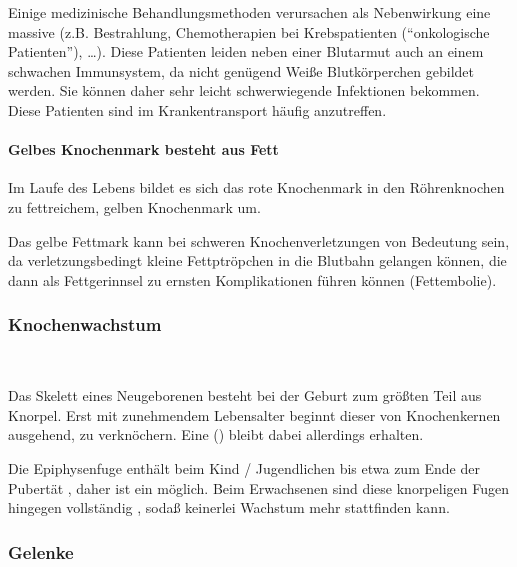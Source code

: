 
Einige medizinische Behandlungsmethoden
verursachen als Nebenwirkung eine massive  (z.B. Bestrahlung, Chemotherapien bei
Krebspatienten ("`onkologische
Patienten"'), \ldots). Diese Patienten leiden neben einer
Blutarmut auch an einem schwachen Immunsystem, da nicht gen\"ugend Wei{\ss}e Blutk\"orperchen gebildet werden. Sie k\"onnen daher sehr
leicht schwerwiegende Infektionen bekommen. Diese Patienten
sind im Krankentransport h\"aufig anzutreffen. 

\paragraph{Gelbes Knochenmark besteht aus Fett} 

Im Laufe des Lebens bildet es sich das rote Knochenmark in den
R\"ohrenknochen zu fettreichem, gelben Knochenmark um. 

Das gelbe Fettmark kann bei schweren Knochenverletzungen von Bedeutung
sein, da verletzungs\-bedingt kleine Fettptr\"opchen in die Blutbahn
gelangen k\"onnen, die dann als Fettgerinnsel  zu ernsten
Komplikationen f\"uhren k\"onnen
(Fettembolie).

\subsubsection{Knochenwachstum}~

\gMarried
{Das Skelett eines Neugeborenen besteht bei der Geburt zum gr\"o{\ss}ten
Teil aus Knorpel. Erst mit zunehmendem Lebensalter beginnt dieser von
Knochenkernen ausgehend, zu verkn\"ochern. Eine
() bleibt dabei allerdings erhalten.

Die Epiphysenfuge enth\"alt beim Kind / Jugendlichen bis
etwa zum Ende der Pubert\"at , daher ist ein 
m\"oglich. Beim Erwachsenen sind diese knorpeligen Fugen
hingegen vollst\"andig , soda{\ss}
keinerlei Wachstum mehr stattfinden kann.} 
{}

\subsubsection{Gelenke}

